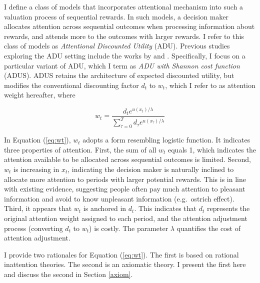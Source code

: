 \documentclass[
  12pt,
]{article}
\begin{document}
I define a class of models that incorporates attentional mechanism into
such a valuation process of sequential rewards. In such models, a
decision maker allocates attention across sequential outcomes when
processing information about rewards, and attends more to the outcomes
with larger rewards. I refer to this class of models as
\emph{Attentional Discounted Utility} (ADU). Previous studies exploring
the ADU setting include the works by \citet{gershman_rationally_2020}
and \citet{noor_optimal_2022}. Specifically, I focus on a particular
variant of ADU, which I term as \emph{ADU with Shannon cost function}
(ADUS). ADUS retains the architecture of expected discounted utility,
but modifies the conventional discounting factor \(d_t\) to \(w_t\),
which I refer to as attention weight hereafter, where

\begin{equation}\tag{1}\label{eq:wt}
w_t = \frac{d_t e^{u(x_t)/\lambda}}{\sum_{\tau=0}^T d_\tau e^{u(x_\tau)/\lambda}}
\end{equation}

In Equation (\ref{eq:wt}), \(w_t\) adopts a form resembling logistic
function. It indicates three properties of attention. First, the sum of
all \(w_t\) equals 1, which indicates the attention available to be
allocated across sequential outcomes is limited. Second, \(w_t\) is
increasing in \(x_t\), indicating the decision maker is naturally
inclined to allocate more attention to periods with larger potential
rewards. This is in line with existing evidence, suggesting people often
pay much attention to pleasant information and avoid to know unpleasant
information (e.g.~ostrich effect). Third, it appears that \(w_t\) is
anchored in \(d_t\). This indicates that \(d_t\) represents the original
attention weight assigned to each period, and the attention adjustment
process (converting \(d_t\) to \(w_t\)) is costly. The parameter
\(\lambda\) quantifies the cost of attention adjustment.

I provide two rationales for Equation (\ref{eq:wt}). The first is based
on rational inattention theories. The second is an axiomatic theory. I
present the first here and discuss the second in Section \ref{axiom}.
\end{document}
